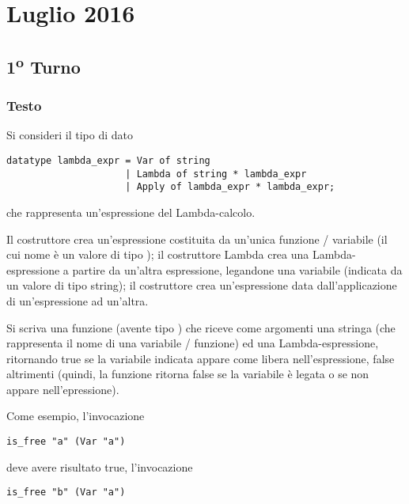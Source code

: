 \section{Luglio 2016}

\subsection{1\textsuperscript{o} Turno}

\subsubsection{Testo}

Si consideri il tipo di dato

\begin{lstlisting}[style = SML, caption = {Definizione del tipo di dato \sml{espressione Lambda}}]
datatype lambda_expr = Var of string
					 | Lambda of string * lambda_expr
					 | Apply of lambda_expr * lambda_expr;
\end{lstlisting}

che rappresenta un'espressione del Lambda-calcolo.

\medskip
Il costruttore  crea un'espressione costituita da un'unica funzione / variabile (il cui nome è un valore di tipo );
il costruttore Lambda crea una Lambda-espressione a partire da un'altra espressione, legandone una variabile (indicata da un valore di tipo string);
il costruttore  crea un'espressione data dall'applicazione di un'espressione ad un'altra.

\medskip
Si scriva una funzione  (avente tipo ) che riceve come argomenti una stringa (che rappresenta il nome di una variabile / funzione) ed una Lambda-espressione, %
ritornando true se la variabile indicata appare come libera nell'espressione, %
false altrimenti (quindi, la funzione ritorna false se la variabile è legata o se non appare nell'epressione).

\medskip
Come esempio, l'invocazione

\begin{lstlisting}
is_free "a" (Var "a")
\end{lstlisting}

deve avere risultato true, l'invocazione

\begin{lstlisting}
is_free "b" (Var "a")
\end{lstlisting}

